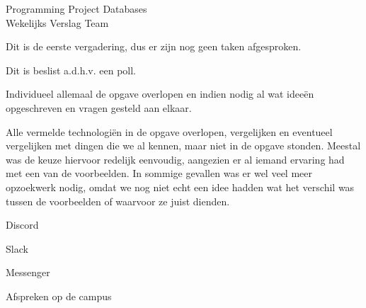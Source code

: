 \documentclass{article}
\newcounter{team}
\begin{document}
	
	\begin{Minutes}{Programming Project Databases \\ Wekelijks Verslag Team }
		\missingNoExcuse{/}
		
		\maketitle
		
		
		
			Dit is de eerste vergadering, dus er zijn nog geen taken afgesproken.
		
			

			
					Dit is beslist a.d.h.v. een poll.
					\begin{Vote}
					\end{Vote}
					Individueel allemaal de opgave overlopen en indien nodig al wat idee\"en opgeschreven en vragen gesteld aan elkaar.
				
					Alle vermelde technologi\"en in de opgave overlopen, vergelijken en eventueel vergelijken met dingen die we al kennen, maar niet in de opgave stonden. Meestal was de keuze hiervoor redelijk eenvoudig, aangezien er al iemand ervaring had met een van de voorbeelden. In sommige gevallen was er wel veel meer opzoekwerk nodig, omdat we nog niet echt een idee hadden wat het verschil was tussen de voorbeelden of waarvoor ze juist dienden.
					
			
				\begin{Opinions}
					\item Discord
					\item Slack
					\item Messenger
					\item Afspreken op de campus
				\end{Opinions}
				

\end{Minutes}
\end{document}
